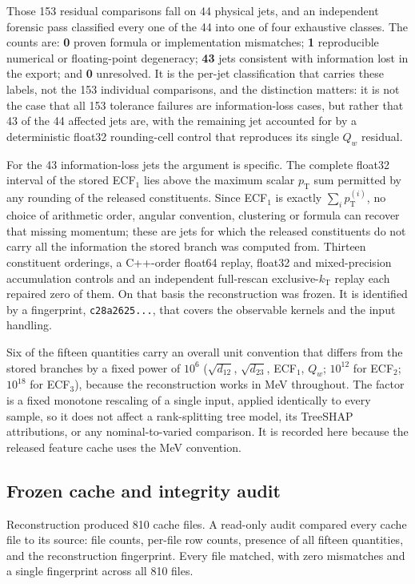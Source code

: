 \documentclass[pdflatex,sn-mathphys,Numbered,iicol]{sn-jnl}
\newcommand{\pt}{p_{\mathrm{T}}}
\begin{document}
Those 153 residual comparisons fall on 44 physical jets, and an independent forensic
pass classified every one of the 44 into one of four exhaustive classes. The counts
are: \textbf{0} proven formula or implementation mismatches; \textbf{1} reproducible
numerical or floating-point degeneracy; \textbf{43} jets consistent with information
lost in the export; and \textbf{0} unresolved. It is the per-jet classification that
carries these labels, not the 153 individual comparisons, and the distinction matters:
it is not the case that all 153 tolerance failures are information-loss cases, but
rather that 43 of the 44 affected jets are, with the remaining jet accounted for by a
deterministic float32 rounding-cell control that reproduces its single $Q_w$ residual.

For the 43 information-loss jets the argument is specific. The complete float32
interval of the stored ECF$_1$ lies above the maximum scalar $\pt$ sum permitted by any
rounding of the released constituents. Since ECF$_1$ is exactly $\sum_i \pt^{(i)}$, no
choice of arithmetic order, angular convention, clustering or formula can recover that
missing momentum; these are jets for which the released constituents do not carry all
the information the stored branch was computed from. Thirteen constituent orderings, a
C++-order float64 replay, float32 and mixed-precision accumulation controls and an
independent full-rescan exclusive-$k_{\mathrm{T}}$ replay each repaired zero of them.
On that basis the reconstruction was frozen. It is identified by a fingerprint,
\texttt{c28a2625...}, that covers the observable kernels and the input handling.

Six of the fifteen quantities carry an overall unit convention that differs from the
stored branches by a fixed power of $10^{6}$ ($\sqrt{d_{12}}$, $\sqrt{d_{23}}$,
ECF$_1$, $Q_w$; $10^{12}$ for ECF$_2$; $10^{18}$ for ECF$_3$), because the
reconstruction works in MeV throughout. The factor is a fixed monotone rescaling of a
single input, applied identically to every sample, so it does not affect a
rank-splitting tree model, its TreeSHAP attributions, or any nominal-to-varied
comparison. It is recorded here because the released feature cache uses the MeV
convention.

\subsection{Frozen cache and integrity audit}
\label{sec:cacheaudit}

Reconstruction produced 810 cache files. A read-only audit compared every cache file to
its source: file counts, per-file row counts, presence of all fifteen quantities, and
the reconstruction fingerprint. Every file matched, with zero mismatches and a single
fingerprint across all 810 files.
\end{document}
